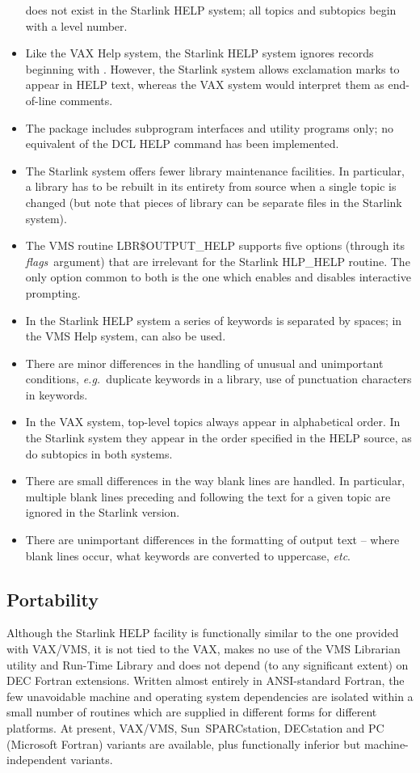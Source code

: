 \begin{itemize}
does not exist in the Starlink HELP system;  all topics and subtopics
begin with a level number.
\item Like the VAX Help system, the Starlink HELP system ignores
records beginning with \fstring{!}.  However, the Starlink
system allows exclamation marks to appear in HELP text, whereas
the VAX system would interpret them as end-of-line comments.
\item The package includes subprogram interfaces and utility
programs only;  no equivalent of the DCL HELP command
has been implemented.
\item The Starlink system offers fewer library maintenance facilities.
In particular, a library has to be rebuilt in its entirety from source
when a single topic is changed (but note that pieces of library
can be separate files in the Starlink system).
\item The VMS routine LBR\$OUTPUT\_HELP supports five options
(through its {\it flags}\, argument) that are irrelevant for the
Starlink HLP\_HELP routine.  The only option common to both is
the one which enables and disables interactive prompting.
\item In the Starlink HELP system a series of keywords is
separated by spaces;  in the VMS Help system, \fstring{/} can also
be used.
\item There are minor differences in the handling of unusual
and unimportant conditions, {\it e.g.}\ duplicate keywords in
a library, use of punctuation characters in keywords.
\item In the VAX system, top-level topics always appear in
alphabetical order.  In the Starlink system they appear in the order
specified in the HELP source, as do subtopics in both systems.
\item There are small differences in the way blank lines
are handled.  In particular, multiple
blank lines preceding and following
the text for a given topic are ignored in the Starlink version.
\item There are unimportant differences in the formatting of
output text -- where blank lines occur, what keywords are
converted to uppercase, {\it etc}.
\end{itemize}

\subsection{Portability}
Although the Starlink HELP facility is
functionally similar to the one provided
with VAX/VMS, it is not tied to the VAX, makes no use of the VMS
Librarian utility and Run-Time Library and does not depend (to any
significant extent) on DEC Fortran extensions.  Written almost entirely
in ANSI-standard Fortran, the few unavoidable machine and operating
system dependencies are isolated within a small number of routines which
are supplied in different forms for different platforms.  At present,
VAX/VMS, Sun~SPARCstation, DECstation and
PC (Microsoft Fortran) variants are available, plus
functionally inferior but machine-independent variants.

